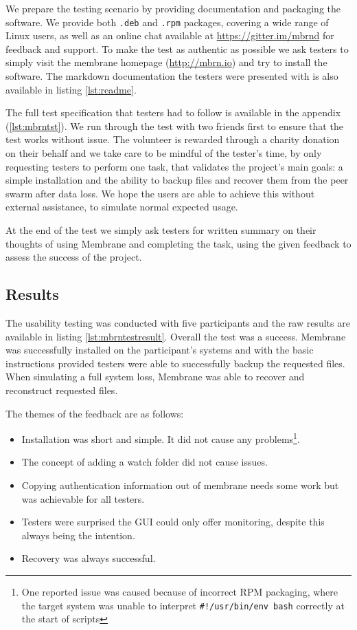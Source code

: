 \documentclass[11pt, a4paper, twoside]{report}
\def\code#1{\texttt{#1}}
\begin{document}
We prepare the testing scenario by providing documentation and packaging the software. We provide both \code{.deb} and \code{.rpm} packages, covering a wide range of Linux users, as well as an online chat available at \url{https://gitter.im/mbrnd} for feedback and support. To make the test as authentic as possible we ask testers to simply visit the membrane homepage (\url{http://mbrn.io}) and try to install the software. The markdown documentation the testers were presented with is also available in listing \ref{lst:readme}.

The full test specification that testers had to follow is available in the appendix (\ref{lst:mbrntst}). We run through the test with two friends first to ensure that the test works without issue. The volunteer is rewarded through a charity donation on their behalf and we take care to be mindful of the tester's time, by only requesting testers to perform one task, that validates the project's main goals: a simple installation and the ability to backup files and recover them from the peer swarm after data loss. We hope the users are able to achieve this without external assistance, to simulate normal expected usage.

At the end of the test we simply ask testers for written summary on their thoughts of using Membrane and completing the task, using the given feedback to assess the success of the project.

\subsection{Results}

The usability testing was conducted with five participants and the raw results are available in listing \ref{lst:mbrntestresult}. Overall the test was a success. Membrane was successfully installed on the participant's systems and with the basic instructions provided testers were able to successfully backup the requested files. When simulating a full system loss, Membrane was able to recover and reconstruct requested files.

The themes of the feedback are as follows:

\begin{itemize}
 \item Installation was short and simple. It did not cause any problems\footnote{One reported issue was caused because of incorrect RPM packaging, where the target system was unable to interpret \code{\#!/usr/bin/env bash} correctly at the start of scripts}.
 \item The concept of adding a watch folder did not cause issues.
 \item Copying authentication information out of membrane needs some work but was achievable for all testers.
 \item Testers were surprised the GUI could only offer monitoring, despite this always being the intention.
 \item Recovery was always successful.
\end{itemize}
\end{document}
